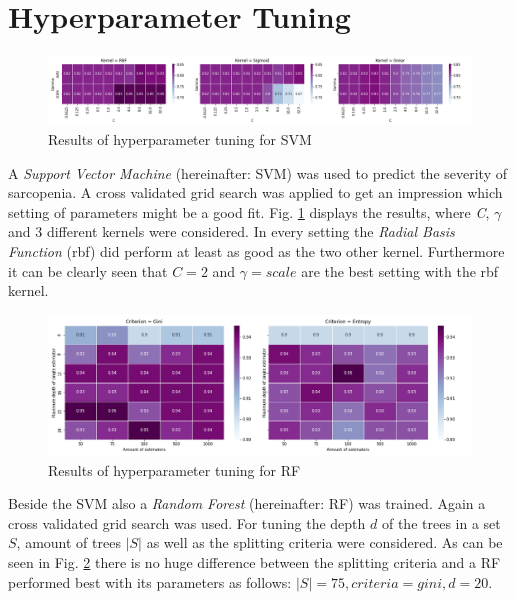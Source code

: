 \documentclass[11pt]{article}
\begin{document}
\section{Hyperparameter Tuning}
\begin{figure}[t]
\includegraphics[width=\linewidth]{heatmap_svc_hyperparameter.png}
\caption{Results of hyperparameter tuning for SVM}
\label{fig:hyper_svc}
\end{figure}

A \emph{Support Vector Machine} (hereinafter: SVM) was used to predict the severity of sarcopenia. A cross validated grid search was applied to get an impression which setting of parameters might be a good fit. Fig. \ref{fig:hyper_svc} displays the results, where \emph{C}, $\gamma$ and 3 different kernels were considered. In every setting the \emph{Radial Basis Function} (rbf) did perform at least as good as the two other kernel. Furthermore it can be clearly seen that $C=2$ and $\gamma=scale$ are the best setting with the rbf kernel.

\begin{figure}[t]
\includegraphics[width=\linewidth]{heatmap_rf_hyperparameter.png}
\caption{Results of hyperparameter tuning for RF}
\label{fig:hyper_rf}
\end{figure}

Beside the SVM also a \emph{Random Forest} (hereinafter: RF) was trained. Again a cross validated grid search was used. For tuning the depth $d$ of the trees in a set $S$, amount of trees $|S|$ as well as the splitting criteria were considered. As can be seen in Fig. \ref{fig:hyper_rf} there is no huge difference between the splitting criteria and a RF performed best with its parameters as follows: $|S|= 75, criteria = gini, d=20$.
\end{document}
